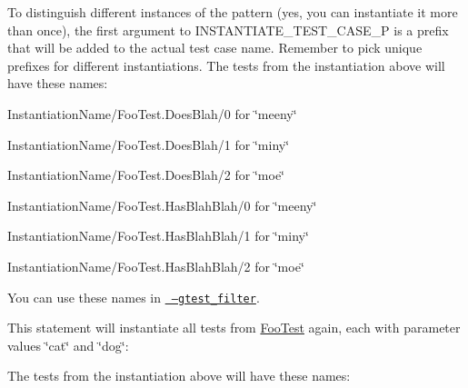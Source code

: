 \begin{DoxyCode}{0}
\end{DoxyCode}


To distinguish different instances of the pattern (yes, you can instantiate it more than once), the first argument to {\ttfamily I\+N\+S\+T\+A\+N\+T\+I\+A\+T\+E\+\_\+\+T\+E\+S\+T\+\_\+\+C\+A\+S\+E\+\_\+P} is a prefix that will be added to the actual test case name. Remember to pick unique prefixes for different instantiations. The tests from the instantiation above will have these names\+:


\begin{DoxyItemize}
\item {\ttfamily Instantiation\+Name/\+Foo\+Test.\+Does\+Blah/0} for {\ttfamily \char`\"{}meeny\char`\"{}}
\item {\ttfamily Instantiation\+Name/\+Foo\+Test.\+Does\+Blah/1} for {\ttfamily \char`\"{}miny\char`\"{}}
\item {\ttfamily Instantiation\+Name/\+Foo\+Test.\+Does\+Blah/2} for {\ttfamily \char`\"{}moe\char`\"{}}
\item {\ttfamily Instantiation\+Name/\+Foo\+Test.\+Has\+Blah\+Blah/0} for {\ttfamily \char`\"{}meeny\char`\"{}}
\item {\ttfamily Instantiation\+Name/\+Foo\+Test.\+Has\+Blah\+Blah/1} for {\ttfamily \char`\"{}miny\char`\"{}}
\item {\ttfamily Instantiation\+Name/\+Foo\+Test.\+Has\+Blah\+Blah/2} for {\ttfamily \char`\"{}moe\char`\"{}}
\end{DoxyItemize}

You can use these names in \href{#running-a-subset-of-the-tests}\texttt{ --gtest\+\_\+filter}.

This statement will instantiate all tests from {\ttfamily \mbox{\hyperlink{class_foo_test}{Foo\+Test}}} again, each with parameter values {\ttfamily \char`\"{}cat\char`\"{}} and {\ttfamily \char`\"{}dog\char`\"{}}\+:


\begin{DoxyCode}{0}
\end{DoxyCode}


The tests from the instantiation above will have these names\+:


